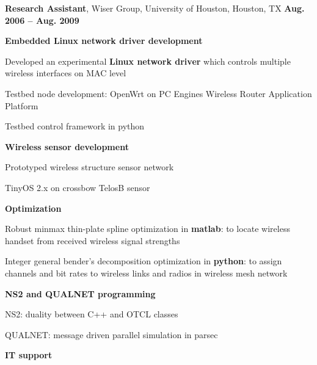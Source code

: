 \documentclass[overlapped, line]{resume}
\begin{document}
\begin{resume}
\begin{list2}
         \end{list2}  \vspace{-5pt}


         {\bf Research Assistant}, Wiser Group, University of Houston, Houston, TX \hfill {\bf Aug. 2006 -- Aug. 2009}\\
         \vspace{-10pt}      %
         \begin{list2}
         \item \textbf{Embedded Linux network driver development}
           \begin{list2}
           \item Developed an experimental {\bf Linux network driver} which controls multiple wireless interfaces on MAC level
           \item Testbed node development: OpenWrt on PC Engines Wireless Router Application Platform
           \item Testbed control framework in python
           \end{list2}
         \item \textbf{Wireless sensor development}
           \begin{list2}
           \item Prototyped wireless structure sensor network
           \item TinyOS 2.x on crossbow TelosB sensor
           \end{list2}
         \item \textbf{Optimization}
           \begin{list2}
           \item Robust minmax thin-plate spline optimization in \textbf{matlab}: to locate wireless handset from received wireless signal strengths
           \item Integer general bender's decomposition optimization in \textbf{python}: to assign channels and bit rates to wireless links and radios in wireless mesh network
           \end{list2}
         \item \textbf{NS2 and QUALNET programming}
           \begin{list2}
           \item NS2: duality between C++ and OTCL classes
           \item QUALNET: message driven parallel simulation in parsec
           \end{list2}
         \item \textbf{IT support}

\end{list2}
\end{resume}
\end{document}
